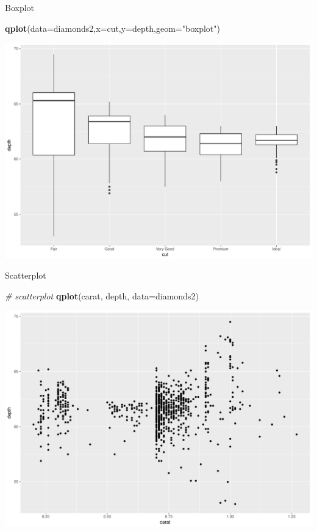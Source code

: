 \documentclass[ignorenonframetext,]{beamer}
\newenvironment{Shaded}{}{}
\newcommand{\KeywordTok}[1]{\textcolor[rgb]{0.00,0.44,0.13}{\textbf{{#1}}}}
\newcommand{\DataTypeTok}[1]{\textcolor[rgb]{0.56,0.13,0.00}{{#1}}}
\newcommand{\StringTok}[1]{\textcolor[rgb]{0.25,0.44,0.63}{{#1}}}
\newcommand{\CommentTok}[1]{\textcolor[rgb]{0.38,0.63,0.69}{\textit{{#1}}}}
\newcommand{\NormalTok}[1]{{#1}}
\begin{document}
\begin{frame}[fragile]{Boxplot}

\begin{Shaded}
\begin{Highlighting}[]
\KeywordTok{qplot}\NormalTok{(}\DataTypeTok{data=}\NormalTok{diamonds2,}\DataTypeTok{x=}\NormalTok{cut,}\DataTypeTok{y=}\NormalTok{depth,}\DataTypeTok{geom=}\StringTok{"boxplot"}\NormalTok{)}
\end{Highlighting}
\end{Shaded}

\includegraphics{RSocialScience2_files/figure-beamer/unnamed-chunk-13-1.pdf}

\end{frame}

\begin{frame}[fragile]{Scatterplot}

\begin{Shaded}
\begin{Highlighting}[]
\CommentTok{# scatterplot}
\KeywordTok{qplot}\NormalTok{(carat, depth, }\DataTypeTok{data=}\NormalTok{diamonds2)}
\end{Highlighting}
\end{Shaded}

\includegraphics{RSocialScience2_files/figure-beamer/unnamed-chunk-14-1.pdf}

\end{frame}
\end{document}
